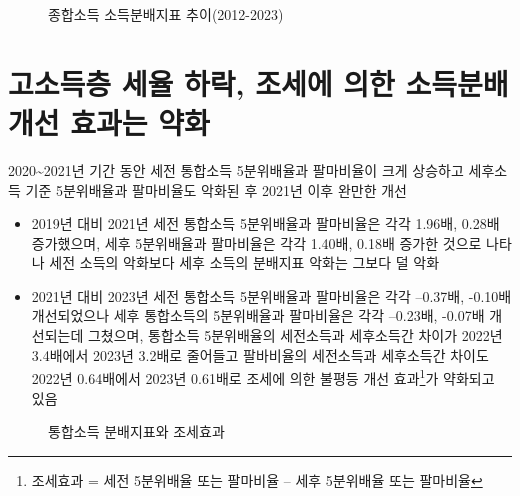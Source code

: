 \documentclass[
  a4paper,
  oneside,
  open=any]{scrbook}
\begin{document}
\begin{figure}

\caption{\label{fig-dis3}종합소득 소득분배지표 추이(2012-2023)}


\end{figure}%

\section{고소득층 세율 하락, 조세에 의한 소득분배 개선 효과는
약화}\label{uxace0uxc18cuxb4dduxce35-uxc138uxc728-uxd558uxb77d-uxc870uxc138uxc5d0-uxc758uxd55c-uxc18cuxb4dduxbd84uxbc30-uxac1cuxc120-uxd6a8uxacfcuxb294-uxc57duxd654}

2020\textasciitilde2021년 기간 동안 세전 통합소득 5분위배율과 팔마비율이
크게 상승하고 세후소득 기준 5분위배율과 팔마비율도 악화된 후 2021년 이후
완만한 개선

\begin{itemize}
\item
  2019년 대비 2021년 세전 통합소득 5분위배율과 팔마비율은 각각 1.96배,
  0.28배 증가했으며, 세후 5분위배율과 팔마비율은 각각 1.40배, 0.18배
  증가한 것으로 나타나 세전 소득의 악화보다 세후 소득의 분배지표 악화는
  그보다 덜 악화
\item
  2021년 대비 2023년 세전 통합소득 5분위배율과 팔마비율은 각각 --0.37배,
  -0.10배 개선되었으나 세후 통합소득의 5분위배율과 팔마비율은 각각
  --0.23배, -0.07배 개선되는데 그쳤으며, 통합소득 5분위배율의 세전소득과
  세후소득간 차이가 2022년 3.4배에서 2023년 3.2배로 줄어들고 팔바비율의
  세전소득과 세후소득간 차이도 2022년 0.64배에서 2023년 0.61배로 조세에
  의한 불평등 개선 효과\footnote{조세효과 = 세전 5분위배율 또는 팔마비율
    -- 세후 5분위배율 또는 팔마비율}가 약화되고 있음
\end{itemize}

\begin{figure}

\caption{\label{fig-dist3_1}통합소득 분배지표와 조세효과}


\end{figure}%
\end{document}
